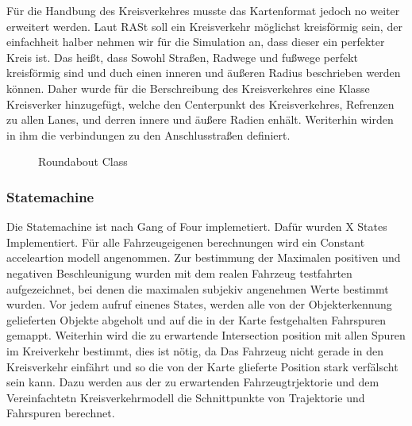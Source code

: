 \documentclass[11pt,oneside,openright]{mpreport}
\begin{document}
Für die Handbung des Kreisverkehres musste das Kartenformat jedoch no weiter erweitert werden. Laut RASt \cite{rast06} soll ein Kreisverkehr möglichst kreisförmig sein, 
der einfachheit halber nehmen wir für die Simulation an, dass dieser ein perfekter Kreis ist. Das heißt, dass Sowohl Straßen, Radwege und fußwege perfekt kreisförmig sind und
duch einen inneren und äußeren Radius beschrieben werden können. Daher wurde für die Berschreibung des Kreisverkehres eine Klasse Kreisverker hinzugefügt,
welche den Centerpunkt des Kreisverkehres, Refrenzen zu allen Lanes, und derren innere und äußere Radien enhält. Weriterhin wirden in ihm die verbindungen zu den Anschlusstraßen definiert.

\begin{figure}[!ht]
\caption{Roundabout Class}
\label{roundabout_class}
\end{figure}

\subsubsection{Statemachine}

Die Statemachine ist nach Gang of Four  \cite{lester2008gang} implemetiert. Dafür wurden X  States Implementiert.
Für alle Fahrzeugeigenen berechnungen wird ein Constant acceleartion modell angenommen. Zur bestimmung der Maximalen positiven und negativen Beschleunigung
wurden mit dem realen Fahrzeug testfahrten aufgezeichnet, bei denen die maximalen subjekiv angenehmen Werte bestimmt wurden.
Vor jedem aufruf einenes States, werden alle von der Objekterkennung gelieferten Objekte abgeholt und auf die in der Karte festgehalten Fahrspuren gemappt.
Weiterhin wird die zu erwartende Intersection position mit allen Spuren im Kreiverkehr bestimmt, dies ist nötig, da Das Fahrzeug nicht gerade in den Kreisverkehr einfährt
und so die von der Karte glieferte Position stark verfälscht sein kann. Dazu werden aus der zu erwartenden Fahrzeugtrjektorie und dem Vereinfachtetn Kreisverkehrmodell
die Schnittpunkte von Trajektorie und Fahrspuren berechnet.
\end{document}

